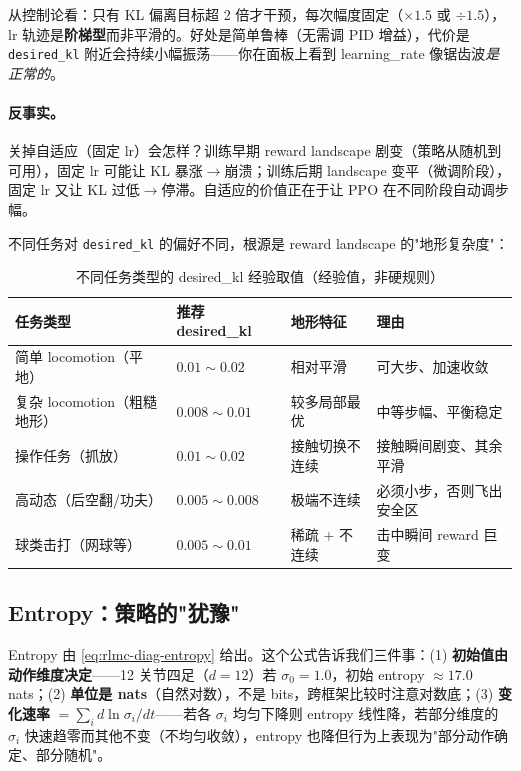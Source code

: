 从控制论看：只有 KL 偏离目标超 2 倍才干预，每次幅度固定（$\times1.5$ 或 $\div1.5$），lr 轨迹是\textbf{阶梯型}而非平滑的。好处是简单鲁棒（无需调 PID 增益），代价是 \verb|desired_kl| 附近会持续小幅振荡——你在面板上看到 learning\_rate 像锯齿波\emph{是正常的}。

\paragraph{反事实。}关掉自适应（固定 lr）会怎样？训练早期 reward landscape 剧变（策略从随机到可用），固定 lr 可能让 KL 暴涨$\to$崩溃；训练后期 landscape 变平（微调阶段），固定 lr 又让 KL 过低$\to$停滞。自适应的价值正在于让 PPO 在不同阶段自动调步幅。

不同任务对 \verb|desired_kl| 的偏好不同，根源是 reward landscape 的"地形复杂度"：

\begin{table}[H]
\centering
\caption{不同任务类型的 desired\_kl 经验取值（经验值，非硬规则）}
\label{tab:rlmc-diag-kl}
\begin{tabular}{p{3.6cm}p{2.4cm}p{3.2cm}p{3.0cm}}
\hline
任务类型 & 推荐 desired\_kl & 地形特征 & 理由 \\
\hline
简单 locomotion（平地） & $0.01\sim0.02$ & 相对平滑 & 可大步、加速收敛 \\
复杂 locomotion（粗糙地形） & $0.008\sim0.01$ & 较多局部最优 & 中等步幅、平衡稳定 \\
操作任务（抓放） & $0.01\sim0.02$ & 接触切换不连续 & 接触瞬间剧变、其余平滑 \\
高动态（后空翻/功夫） & $0.005\sim0.008$ & 极端不连续 & 必须小步，否则飞出安全区 \\
球类击打（网球等） & $0.005\sim0.01$ & 稀疏 $+$ 不连续 & 击中瞬间 reward 巨变 \\
\hline
\end{tabular}
\end{table}

\subsection{Entropy：策略的"犹豫"}

Entropy 由 \eqref{eq:rlmc-diag-entropy} 给出。这个公式告诉我们三件事：(1) \textbf{初始值由动作维度决定}——12 关节四足（$d=12$）若 $\sigma_0=1.0$，初始 entropy $\approx 17.0$ nats；(2) \textbf{单位是 nats}（自然对数），不是 bits，跨框架比较时注意对数底；(3) \textbf{变化速率} $=\sum_i d\ln\sigma_i/dt$——若各 $\sigma_i$ 均匀下降则 entropy 线性降，若部分维度的 $\sigma_i$ 快速趋零而其他不变（不均匀收敛），entropy 也降但行为上表现为"部分动作确定、部分随机"。

